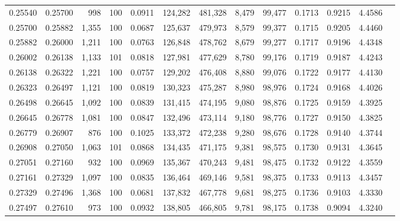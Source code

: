 \begin{tabular}{rrrrrrrrrrrrr}
0.25540 & 0.25700 &   998 & 100 &                                     0.0911 & 124,282 & 481,328 &   8,479 &  99,477 & 0.1713 & 0.9215 & 4.4586 \\
0.25700 & 0.25882 & 1,355 & 100 &                                     0.0687 & 125,637 & 479,973 &   8,579 &  99,377 & 0.1715 & 0.9205 & 4.4460 \\
0.25882 & 0.26000 & 1,211 & 100 &                                     0.0763 & 126,848 & 478,762 &   8,679 &  99,277 & 0.1717 & 0.9196 & 4.4348 \\
0.26002 & 0.26138 & 1,133 & 101 &                                     0.0818 & 127,981 & 477,629 &   8,780 &  99,176 & 0.1719 & 0.9187 & 4.4243 \\
0.26138 & 0.26322 & 1,221 & 100 &                                     0.0757 & 129,202 & 476,408 &   8,880 &  99,076 & 0.1722 & 0.9177 & 4.4130 \\
0.26323 & 0.26497 & 1,121 & 100 &                                     0.0819 & 130,323 & 475,287 &   8,980 &  98,976 & 0.1724 & 0.9168 & 4.4026 \\
0.26498 & 0.26645 & 1,092 & 100 &                                     0.0839 & 131,415 & 474,195 &   9,080 &  98,876 & 0.1725 & 0.9159 & 4.3925 \\
0.26645 & 0.26778 & 1,081 & 100 &                                     0.0847 & 132,496 & 473,114 &   9,180 &  98,776 & 0.1727 & 0.9150 & 4.3825 \\
0.26779 & 0.26907 &   876 & 100 &                                     0.1025 & 133,372 & 472,238 &   9,280 &  98,676 & 0.1728 & 0.9140 & 4.3744 \\
0.26908 & 0.27050 & 1,063 & 101 &                                     0.0868 & 134,435 & 471,175 &   9,381 &  98,575 & 0.1730 & 0.9131 & 4.3645 \\
0.27051 & 0.27160 &   932 & 100 &                                     0.0969 & 135,367 & 470,243 &   9,481 &  98,475 & 0.1732 & 0.9122 & 4.3559 \\
0.27161 & 0.27329 & 1,097 & 100 &                                     0.0835 & 136,464 & 469,146 &   9,581 &  98,375 & 0.1733 & 0.9113 & 4.3457 \\
0.27329 & 0.27496 & 1,368 & 100 &                                     0.0681 & 137,832 & 467,778 &   9,681 &  98,275 & 0.1736 & 0.9103 & 4.3330 \\
0.27497 & 0.27610 &   973 & 100 &                                     0.0932 & 138,805 & 466,805 &   9,781 &  98,175 & 0.1738 & 0.9094 & 4.3240 \\

\end{tabular}
